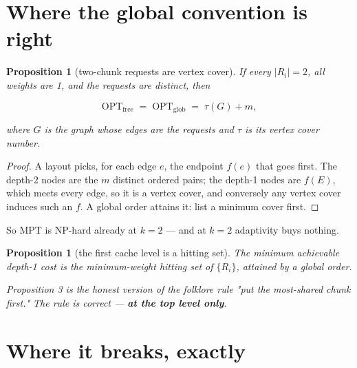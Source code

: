 \documentclass[11pt]{article}
\theoremstyle{plain}
\newtheorem{proposition}[theorem]{Proposition}
\begin{document}
\section{Where the global convention is right}

\begin{proposition}[two-chunk requests are vertex cover]
If every $|R_i| = 2$, all weights are 1, and the requests are distinct, then

\[
\mathrm{OPT}_{\mathrm{free}} \;=\; \mathrm{OPT}_{\mathrm{glob}} \;=\; \tau(G) + m,
\]

where $G$ is the graph whose edges are the requests and $\tau$ is its vertex cover number.
\end{proposition}
\begin{proof}
A layout picks, for each edge $e$, the endpoint $f(e)$ that goes first. The depth-2 nodes are the $m$ distinct ordered pairs; the depth-1 nodes are $f(E)$, which meets every edge, so it is a vertex cover, and conversely any vertex cover induces such an $f$. A global order attains it: list a minimum cover first. 
\end{proof}

So MPT is NP-hard already at $k=2$ --- and at $k=2$ adaptivity buys nothing.

\begin{proposition}[the first cache level is a hitting set]
The minimum achievable depth-1 cost is the minimum-weight hitting set of $\{R_i\}$, attained by a global order.

Proposition 3 is the honest version of the folklore rule \emph{"put the most-shared chunk first."} The rule is correct --- \textbf{at the top level only}.
\end{proposition}
\section{Where it breaks, exactly}
\end{document}
